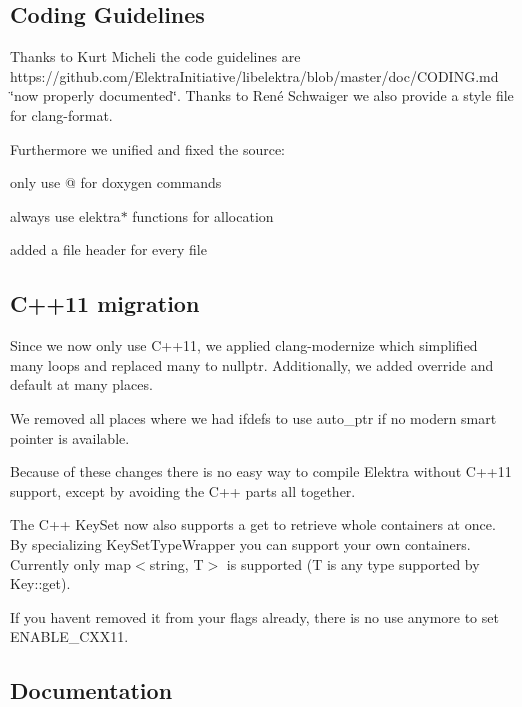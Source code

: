 \subsection*{Coding Guidelines}

Thanks to Kurt Micheli the code guidelines are https\+://github.com/\+Elektra\+Initiative/libelektra/blob/master/doc/\+C\+O\+D\+I\+N\+G.\+md \char`\"{}now properly documented\char`\"{}. Thanks to René Schwaiger we also provide a style file for clang-\/format.

Furthermore we unified and fixed the source\+:


\begin{DoxyItemize}
\item only use @ for doxygen commands
\item always use {\ttfamily elektra$\ast$} functions for allocation
\item added a file header for every file
\end{DoxyItemize}

\subsection*{C++11 migration}

Since we now only use C++11, we applied {\ttfamily clang-\/modernize} which simplified many loops and replaced many {} to {\ttfamily nullptr}. Additionally, we added {\ttfamily override} and {\ttfamily default} at many places.

We removed all places where we had {\ttfamily ifdefs} to use {\ttfamily auto\+\_\+ptr} if no modern smart pointer is available.

Because of these changes there is no easy way to compile Elektra without C++11 support, except by avoiding the C++ parts all together.

The C++ {\ttfamily Key\+Set} now also supports a {\ttfamily get} to retrieve whole containers at once. By specializing {\ttfamily Key\+Set\+Type\+Wrapper} you can support your own containers. Currently only {\ttfamily map$<$string, T$>$} is supported (T is any type supported by {\ttfamily Key\+::get}).

If you haven\textquotesingle{}t removed it from your flags already, there is no use anymore to set {\ttfamily E\+N\+A\+B\+L\+E\+\_\+\+C\+X\+X11}.

\subsection*{Documentation}

